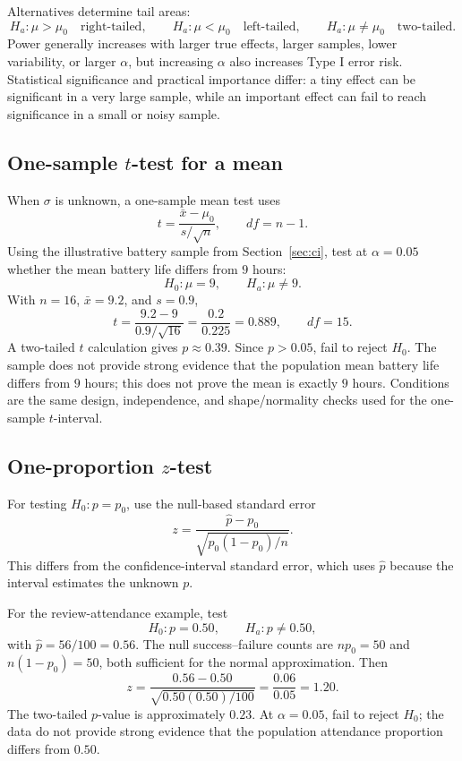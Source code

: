 \documentclass[11pt]{article}
\begin{document}
Alternatives determine tail areas:
\[
H_a:\mu>\mu_0\quad\text{right-tailed},\qquad
H_a:\mu<\mu_0\quad\text{left-tailed},\qquad
H_a:\mu\ne\mu_0\quad\text{two-tailed}.
\]
Power generally increases with larger true effects, larger samples, lower
variability, or larger $\alpha$, but increasing $\alpha$ also increases Type
I error risk.  Statistical significance and practical importance differ: a
tiny effect can be significant in a very large sample, while an important
effect can fail to reach significance in a small or noisy sample.

\subsection{One-sample \texorpdfstring{$t$}{t}-test for a mean}
When $\sigma$ is unknown, a one-sample mean test uses
\begin{equation}\label{eq:t-test}
t=\frac{\bar{x}-\mu_0}{s/\sqrt n},
\qquad df=n-1.
\end{equation}
Using the illustrative battery sample from Section~\ref{sec:ci}, test at
$\alpha=0.05$ whether the mean battery life differs from $9$ hours:
\[
H_0:\mu=9,
\qquad H_a:\mu\ne9.
\]
With $n=16$, $\bar{x}=9.2$, and $s=0.9$,
\[
t=\frac{9.2-9}{0.9/\sqrt{16}}=\frac{0.2}{0.225}=0.889,
\qquad df=15.
\]
A two-tailed $t$ calculation gives $p\approx0.39$.  Since $p>0.05$, fail to
reject $H_0$.  The sample does not provide strong evidence that the population
mean battery life differs from $9$ hours; this does not prove the mean is
exactly $9$ hours.  Conditions are the same design, independence, and
shape/normality checks used for the one-sample $t$-interval.

\subsection{One-proportion \texorpdfstring{$z$}{z}-test}
For testing $H_0:p=p_0$, use the null-based standard error
\begin{equation}\label{eq:prop-test}
z=\frac{\widehat p-p_0}{\sqrt{p_0(1-p_0)/n}}.
\end{equation}
This differs from the confidence-interval standard error, which uses
$\widehat p$ because the interval estimates the unknown $p$.

For the review-attendance example, test
\[
H_0:p=0.50,
\qquad H_a:p\ne0.50,
\]
with $\widehat p=56/100=0.56$.  The null success--failure counts are
$n p_0=50$ and $n(1-p_0)=50$, both sufficient for the normal approximation.
Then
\[
z=\frac{0.56-0.50}{\sqrt{0.50(0.50)/100}}=\frac{0.06}{0.05}=1.20.
\]
The two-tailed $p$-value is approximately $0.23$.  At $\alpha=0.05$, fail to
reject $H_0$; the data do not provide strong evidence that the population
attendance proportion differs from $0.50$.
\end{document}
